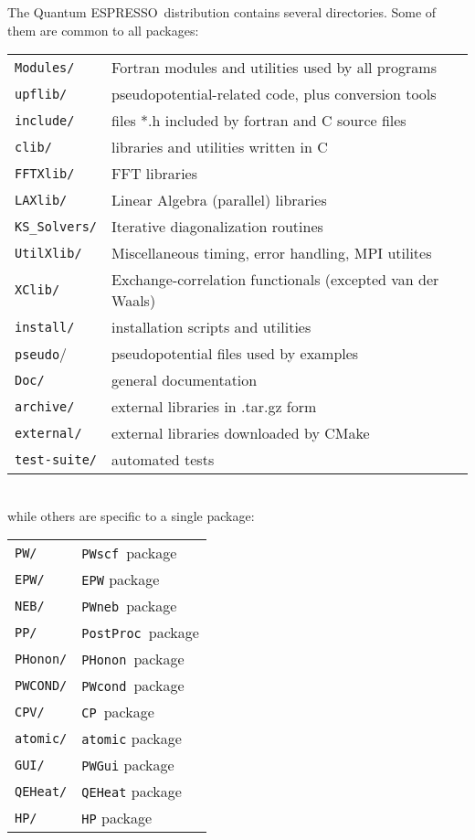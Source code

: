 \documentclass[12pt,a4paper]{article}
\def\qe{{\sc Quantum ESPRESSO}}
\def\PWscf{\texttt{PWscf}}
\def\PHonon{\texttt{PHonon}}
\def\CP{\texttt{CP}}
\def\PostProc{\texttt{PostProc}}
\def\NEB{\texttt{PWneb}}
\begin{document}

The \qe\ distribution contains several directories. Some of them are
common to all packages:

\begin{tabular}{ll}
\texttt{Modules/} &  Fortran modules and utilities used by all programs\\
\texttt{upflib/}  &  pseudopotential-related code, plus conversion tools\\
\texttt{include/} &  files *.h included by fortran and C source files\\
\texttt{clib/}    &  libraries and utilities written in C\\
\texttt{FFTXlib/} &  FFT libraries\\
\texttt{LAXlib/}  &  Linear Algebra (parallel) libraries\\
\texttt{KS\_Solvers/}  &  Iterative diagonalization routines\\
\texttt{UtilXlib/}&  Miscellaneous timing, error handling, MPI utilites\\
\texttt{XClib/}   &  Exchange-correlation functionals (excepted van der Waals)\\
\texttt{install/} &  installation scripts and utilities\\
\texttt{pseudo}/  &  pseudopotential files used by examples\\
\texttt{Doc/}     &  general documentation\\
\texttt{archive/} &  external libraries in .tar.gz form\\
\texttt{external/}&  external libraries downloaded by CMake\\
\texttt{test-suite/} &  automated tests\\
\end{tabular}
\\
while others are specific to a single package:

\begin{tabular}{ll}
\texttt{PW/}      & \PWscf\ package\\
\texttt{EPW/}     & \texttt{EPW} package\\
\texttt{NEB/}     & \NEB\ package\\
\texttt{PP/}      & \PostProc\ package\\
\texttt{PHonon/}  & \PHonon\ package\\
\texttt{PWCOND/}  & \texttt{PWcond}\ package\\
\texttt{CPV/}     & \CP\ package\\
\texttt{atomic/}  & \texttt{atomic} package\\
\texttt{GUI/}     & \texttt{PWGui} package\\
\texttt{QEHeat/}   & \texttt{QEHeat} package\\
\texttt{HP/}      & \texttt{HP} package
\end{tabular}
\end{document}
